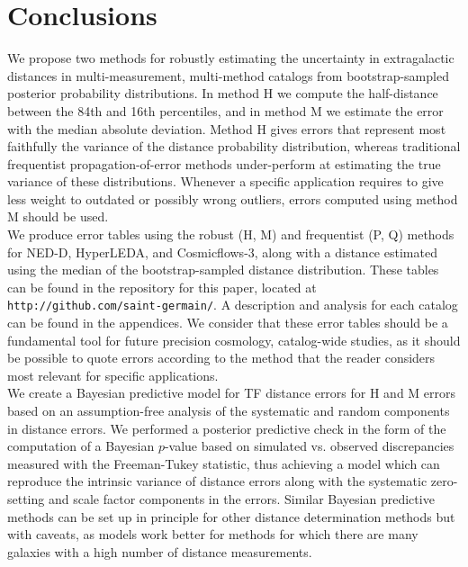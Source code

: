 \documentclass[a4paper,fleqn,usenatbib]{mnras}
\begin{document}
\section{Conclusions}

We propose two methods for robustly estimating the uncertainty in extragalactic distances in multi-measurement, multi-method catalogs from bootstrap-sampled posterior probability distributions. In method H we compute the half-distance between the 84th and 16th percentiles, and in method M we estimate the error with the median absolute deviation. Method H gives errors that represent most faithfully the variance of the distance probability distribution, whereas traditional frequentist propagation-of-error methods under-perform at estimating the true variance of these distributions. Whenever a specific application requires to give less weight to outdated or possibly wrong outliers, errors computed using method M should be used.\\

We produce error tables using the robust (H, M) and frequentist (P, Q) methods for NED-D, HyperLEDA, and Cosmicflows-3, along with a distance estimated using the median of the bootstrap-sampled distance distribution. These tables can be found in the repository for this paper, located at \texttt{http://github.com/saint-germain/}. A description and analysis for each catalog can be found in the appendices. We consider that these error tables should be a fundamental tool for future precision cosmology, catalog-wide studies, as it should be possible to quote errors according to the method that the reader considers most relevant for specific applications.\\

We create a Bayesian predictive model for TF distance errors for H and M errors based on an assumption-free analysis of the systematic and random components in distance errors. We performed a posterior predictive check in the form of the computation of a Bayesian $p$-value based on simulated vs. observed discrepancies measured with the Freeman-Tukey statistic, thus achieving a model which can reproduce the intrinsic variance of distance errors along with the systematic zero-setting and scale factor components in the errors. Similar Bayesian predictive methods can be set up in principle for other distance determination methods but with caveats, as models work better for methods for which there are many galaxies with a high number of distance measurements.\\ 
\end{document}
